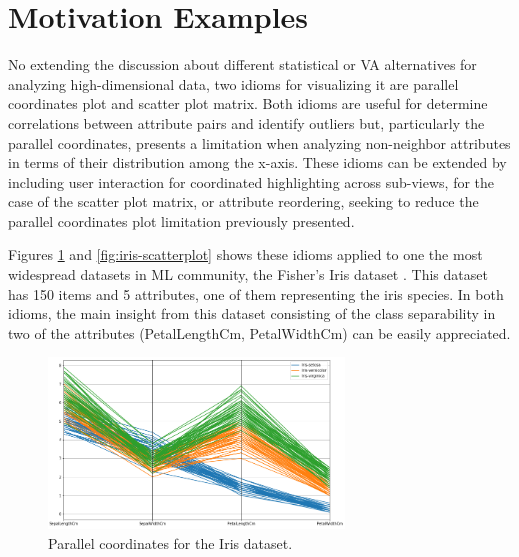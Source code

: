\section{Motivation Examples}
\label{section1.1}

No extending the discussion about different statistical or VA alternatives for analyzing high-dimensional data, two idioms for visualizing it are parallel coordinates plot and scatter plot matrix. Both idioms are useful for determine correlations between attribute pairs and identify outliers but, particularly the parallel coordinates, presents a limitation when analyzing non-neighbor attributes in terms of their distribution among the x-axis. These idioms can be extended by including user interaction for coordinated highlighting across sub-views, for the case of the scatter plot matrix, or attribute reordering, seeking to reduce the parallel coordinates plot limitation previously presented.

Figures \ref{fig:iris-parallel} and \ref{fig:iris-scatterplot} shows these idioms applied to one the most widespread datasets in ML community, the Fisher's Iris dataset \cite{FisherIris}. This dataset has 150 items and 5 attributes, one of them representing the iris species. In both idioms, the main insight from this dataset consisting of the class separability in two of the attributes (PetalLengthCm, PetalWidthCm) can be easily appreciated.

\begin{figure}[ht]
 \centering
 \includegraphics[width=0.7\textwidth]{iris-parallel.png}
 \caption{Parallel coordinates for the Iris dataset.}
 \label{fig:iris-parallel}
\end{figure}

